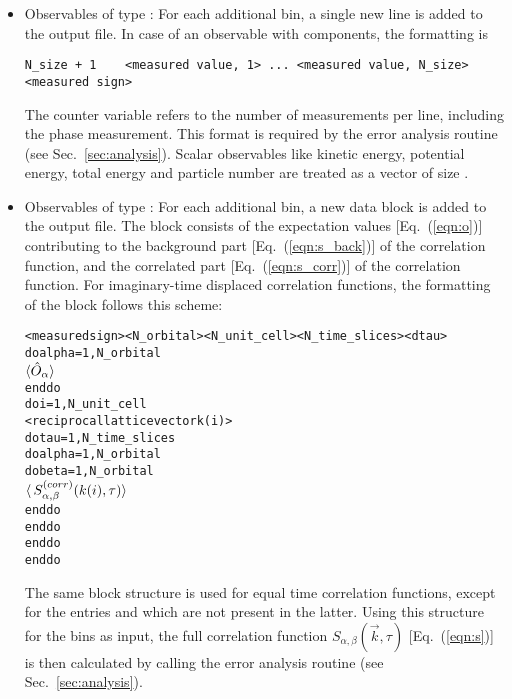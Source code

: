 \begin{itemize}
\item Observables of type :
For each additional bin, a single new line is added to the output file.
In case of an observable with  components, the formatting is 
\begin{verbatim}
N_size + 1    <measured value, 1> ... <measured value, N_size>    <measured sign>
\end{verbatim}
The counter variable  refers to the number of measurements per line, including the phase measurement. 
This format is required by the error analysis routine (see Sec.~\ref{sec:analysis}). 
Scalar observables like kinetic energy, potential energy, total energy and particle number are treated as a vector 
of size .

\item Observables of type :
For each additional bin, a new data block is added to the output file. 
The block consists of the expectation values [Eq.~(\ref{eqn:o})] contributing to the background part [Eq.~(\ref{eqn:s_back})] of the correlation function,
and the correlated part [Eq.~(\ref{eqn:s_corr})] of the correlation function.
For imaginary-time displaced correlation functions, the formatting of the block follows this scheme:
\begin{alltt}
<measured sign>  <N_orbital>  <N_unit_cell> <N_time_slices> <dtau>
do alpha = 1, N_orbital
    \(\langle\hat{O}\sb{\alpha}\rangle \)
enddo
do i = 1, N_unit_cell
   <reciprocal lattice vector k(i)>
   do tau = 1, N_time_slices
      do alpha = 1, N_orbital
         do beta = 1, N_orbital
            \(\langle\,S\sb{\alpha,\beta}\sp{(corr)}(k(i),\tau)\rangle\)
         enddo
      enddo
   enddo
enddo
\end{alltt}
The same block structure is used for equal time correlation functions, except for the entries   and  
which are not present in the latter.
Using this structure for the bins as input,
the full correlation function $S_{\alpha,\beta}(\vec{k},\tau)$ [Eq.~(\ref{eqn:s})] is then calculated by calling the error analysis routine (see Sec.~\ref{sec:analysis}).
\end{itemize}

%
